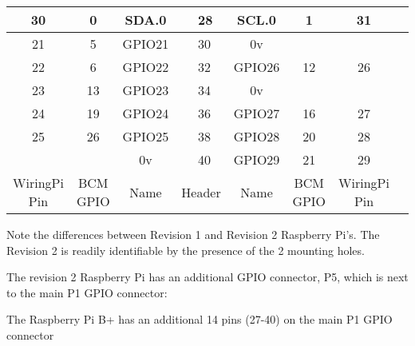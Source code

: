 \documentclass[12pt,a4paper]{article}
\begin{document}
\begin{sffamily}
\begin{center}
\begin{tabular}{|c|c|c||p{8mm}|p{8mm}||c|c|c|c|}
\hline
\hline
30	&  0			& \textcolor{rtb-aqua}{SDA.0}	& \raggedleft{27} & 28 & \textcolor{rtb-aqua}{SCL.0}	& 1 	&  31\\
\hline
21	&  5			& \textcolor{rtb-green}{GPIO21}	& \raggedleft{\textcolor{rtb-orange}{29}} & 30 & \textcolor{rtb-black}{0v}		&   	& \\
\hline
22	&  6			& \textcolor{rtb-green}{GPIO22}	& \raggedleft{\textcolor{rtb-orange}{31}} & \textcolor{rtb-blue}{32} & \textcolor{rtb-green}{GPIO26}	& 12	&  26\\
\hline
23	& 13			& \textcolor{rtb-green}{GPIO23}	& \raggedleft{\textcolor{rtb-blue}{33}} & 34 & \textcolor{rtb-black}{0v}		&   	& \\
\hline
24	& 19			& \textcolor{rtb-green}{GPIO24}	& \raggedleft{\textcolor{rtb-blue}{35}} & \textcolor{rtb-blue}{36} & \textcolor{rtb-green}{GPIO27}	& 16	& 27\\
\hline
25	& 26			& \textcolor{rtb-green}{GPIO25}	& \raggedleft{\textcolor{rtb-blue}{37}} & \textcolor{rtb-blue}{38} & \textcolor{rtb-green}{GPIO28}	& 20	& 28\\
\hline
	& 				& \textcolor{rtb-black}{0v}		& \raggedleft{39} & \textcolor{rtb-blue}{40} & \textcolor{rtb-green}{GPIO29}	& 21	& 29\\
\hline
WiringPi Pin	& BCM GPIO	& Name	& \multicolumn{2}{|c||}{Header}	& Name	& BCM GPIO	& WiringPi Pin\\
\hline
\end{tabular}
\end{center}

Note the differences between Revision 1 and Revision 2 Raspberry
Pi's. The Revision 2 is readily identifiable by the presence of the 2
mounting holes.

The revision 2 Raspberry Pi has an additional GPIO connector, P5, which is next to the main P1 GPIO
connector:

The Raspberry Pi B+ has an additional 14 pins (27-40) on the main P1 GPIO connector


\end{sffamily}
\end{document}
